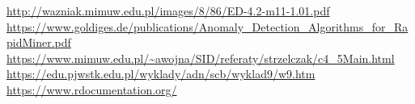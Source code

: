 \documentclass[11pt,a4paper,twoside]{article}
\begin{document}
\begin{thebibliography}{9}
\url{http://wazniak.mimuw.edu.pl/images/8/86/ED-4.2-m11-1.01.pdf}
\url{https://www.goldiges.de/publications/Anomaly_Detection_Algorithms_for_RapidMiner.pdf}
\url{https://www.mimuw.edu.pl/~awojna/SID/referaty/strzelczak/c4_5Main.html}
\url{https://edu.pjwstk.edu.pl/wyklady/adn/scb/wyklad9/w9.htm}
\url{https://www.rdocumentation.org/}


\end{thebibliography}
\end{document}
